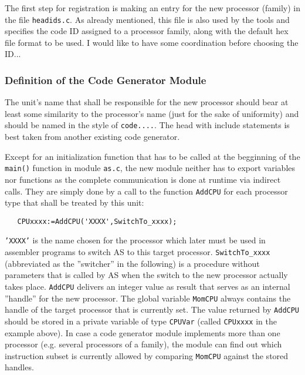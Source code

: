 \documentclass[12pt,twoside]{report}
\newcommand{\tty}[1]{{\tt #1}}
\newcommand{\asname}{{AS}}
\begin{document}
The first step for registration is making an entry for the new processor
(family) in the file {\tt headids.c}.  As already mentioned, this file is
also used by the tools and specifies the code ID assigned to a processor
family, along with the default hex file format to be used.  I would like
to have some coordination before choosing the ID...

\subsubsection{Definition of the Code Generator Module}

The unit's name that shall be responsible for the new processor
should bear at least some similarity to the processor's name (just
for the sake of uniformity) and should be named in the style of
\tty{code....}.  The head with include statements is best taken from
another existing code generator.

Except for an initialization function that has to be called at the
begginning of the {\tt main()} function in module {\tt as.c}, the new
module neither has to export variables nor functions as the complete
communication is done at runtime via indirect calls.  They are simply done
by a call to the function
\tty{AddCPU} for each processor type that shall be treated by this unit:
\begin{verbatim}
   CPUxxxx:=AddCPU('XXXX',SwitchTo_xxxx);
\end{verbatim}
\tty{'XXXX'} is the name chosen for the processor which later must be used
in assembler programs to switch \asname{} to this target processor.
\tty{SwitchTo\_xxxx} (abbreviated as the ''switcher'' in the following) is
a procedure without parameters that is called by \asname{} when the switch to the
new processor actually takes place.  \tty{AddCPU} delivers an integer
value as result that serves as an internal ''handle'' for the new
processor.  The global variable \tty{MomCPU} always contains the handle of
the target processor that is currently set.  The value returned by
\tty{AddCPU} should be stored in a private variable of type \tty{CPUVar}
(called \tty{CPUxxxx} in the example above).  In case a code generator
module implements more than one processor (e.g. several processors of a
family), the module can find out which instruction subset is currently
allowed by comparing \tty{MomCPU} against the stored handles.
\end{document}
